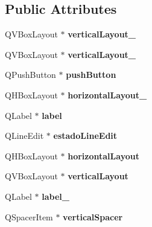 \subsection*{Public Attributes}
\begin{DoxyCompactItemize}
\item 
\mbox{\label{class_ui___widget_a004e166e87cf3bad437fdbb4443c37c8}} 
Q\+V\+Box\+Layout $\ast$ {\bfseries vertical\+Layout\+\_}
\item 
\mbox{\label{class_ui___widget_aacb08d12203102e108d60ab2af782b41}} 
Q\+V\+Box\+Layout $\ast$ {\bfseries vertical\+Layout\+\_}
\item 
\mbox{\label{class_ui___widget_a7dcf5da8902069415662905e93b0d5cb}} 
Q\+Push\+Button $\ast$ {\bfseries push\+Button}
\item 
\mbox{\label{class_ui___widget_afe8e31232d15d702c652c82cf73a9344}} 
Q\+H\+Box\+Layout $\ast$ {\bfseries horizontal\+Layout\+\_}
\item 
\mbox{\label{class_ui___widget_a3126b93450dcc18cede73b9d1ee7c6b0}} 
Q\+Label $\ast$ {\bfseries label}
\item 
\mbox{\label{class_ui___widget_ad5fe173a70281d88389f5fdd6bab0ab6}} 
Q\+Line\+Edit $\ast$ {\bfseries estado\+Line\+Edit}
\item 
\mbox{\label{class_ui___widget_a3c4c8e6c2ed63a33ed25541a364310cb}} 
Q\+H\+Box\+Layout $\ast$ {\bfseries horizontal\+Layout}
\item 
\mbox{\label{class_ui___widget_a90d709ec4c756bd51a2b71274d6ce71e}} 
Q\+V\+Box\+Layout $\ast$ {\bfseries vertical\+Layout}
\item 
\mbox{\label{class_ui___widget_a6f06b143349464b5b19ac0ffe2fc084d}} 
Q\+Label $\ast$ {\bfseries label\+\_}
\item 
\mbox{\label{class_ui___widget_a6a5f699b6ed56b33518050400df8804f}} 
Q\+Spacer\+Item $\ast$ {\bfseries vertical\+Spacer}
\item 

\end{DoxyCompactItemize}
